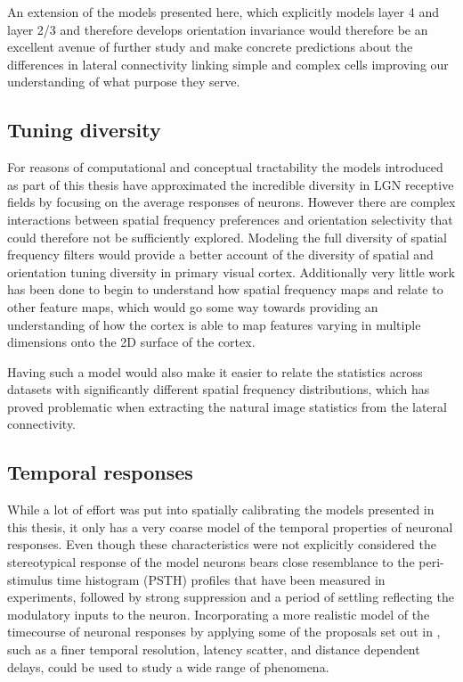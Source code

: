 An extension of the models presented here, which explicitly models
layer 4 and layer 2/3 and therefore develops orientation invariance
would therefore be an excellent avenue of further study and make
concrete predictions about the differences in lateral connectivity
linking simple and complex cells improving our understanding of what
purpose they serve.

\subsection{Tuning diversity}

For reasons of computational and conceptual tractability the models
introduced as part of this thesis have approximated the incredible
diversity in LGN receptive fields by focusing on the average responses
of neurons. However there are complex interactions between spatial
frequency preferences and orientation selectivity that could therefore
not be sufficiently explored. Modeling the full diversity of spatial
frequency filters would provide a better account of the diversity of
spatial and orientation tuning diversity in primary visual
cortex. Additionally very little work has been done to begin to
understand how spatial frequency maps and relate to other feature
maps, which would go some way towards providing an understanding of
how the cortex is able to map features varying in multiple dimensions
onto the 2D surface of the cortex.

Having such a model would also make it easier to relate the statistics
across datasets with significantly different spatial frequency
distributions, which has proved problematic when extracting the
natural image statistics from the lateral connectivity.

\subsection{Temporal responses}

While a lot of effort was put into spatially calibrating the models
presented in this thesis, it only has a very coarse model of the
temporal properties of neuronal responses. Even though these
characteristics were not explicitly considered the stereotypical
response of the model neurons bears close resemblance to the
peri-stimulus time histogram (PSTH) profiles that have been measured
in experiments, followed by strong suppression and a period of
settling reflecting the modulatory inputs to the neuron. Incorporating
a more realistic model of the timecourse of neuronal responses by
applying some of the proposals set out in \cite{Stevens2016}, such as
a finer temporal resolution, latency scatter, and distance dependent
delays, could be used to study a wide range of phenomena.

